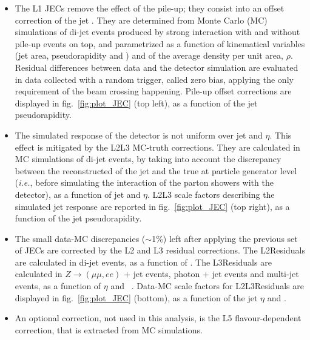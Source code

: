 \begin{itemize}
\item The L1 JECs remove the effect of the pile-up; they consist into an offset correction of the jet \pt. They are determined from Monte Carlo (MC) simulations of di-jet events produced by strong interaction with and without pile-up events on top, and parametrized as a function of kinematical variables (jet area, pseudorapidity and \pt) and of the average \pt density per unit area, $\rho$. Residual differences between data and the detector simulation are evaluated in data collected with a random trigger, called zero bias, applying the only requirement of the beam crossing happening. Pile-up offset corrections are displayed in fig.~\ref{fig:plot_JEC} (top left), as a function of the jet pseudorapidity.
\item The simulated response of the detector is not uniform over jet \pt and $\eta$. This effect is mitigated by the L2L3 MC-truth corrections. They are calculated in MC simulations of di-jet events, by taking into account the discrepancy between the reconstructed \pt of the jet and the true \pt at particle generator level (\textit{i.e.}, before simulating the interaction of the parton showers with the detector), as a function of jet \pt and $\eta$. L2L3 scale factors describing the simulated jet response are reported in fig.~\ref{fig:plot_JEC} (top right), as a function of the jet pseudorapidity.
\item The small data-MC discrepancies ($\sim$1\%) left after applying the previous set of JECs are corrected by the L2 and L3 residual corrections. The L2Residuals are calculated in di-jet events, as a function of \pt. The L3Residuals are calculated in $Z \rightarrow (\mu \mu, ee)$ + jet events, photon + jet events and multi-jet events, as a function of $\eta$ and \pt%
~\cite{bib:1748-0221-6-11-P11002}. Data-MC scale factors for L2L3Residuals are displayed in fig.~\ref{fig:plot_JEC} (bottom), as a function of the jet $\eta$ and \pt.
\item An optional correction, not used in this analysis, is the L5 flavour-dependent correction, that is extracted from MC simulations.
\end{itemize}

